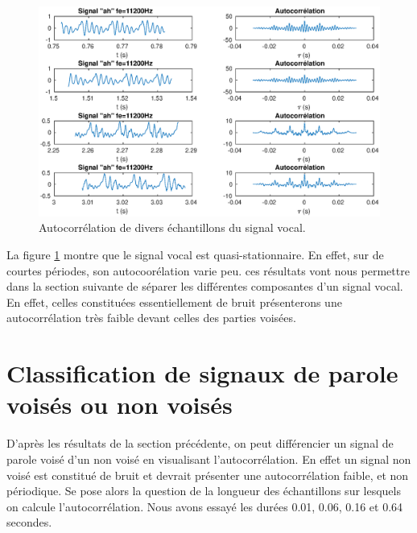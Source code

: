 \documentclass[french]{article}
\begin{document}
\begin{figure}[h!]
\centering
\includegraphics[width=\textwidth]{images/classificationAh.eps}
\caption{Autocorrélation de divers échantillons du signal vocal.}
\label{classifAh}
\end{figure}

La figure \ref{classifAh} montre que le signal vocal est quasi-stationnaire. En effet, sur de courtes périodes, son autocoorélation varie peu. ces résultats vont nous permettre dans la section suivante de séparer les différentes composantes d'un signal vocal. En effet, celles constituées essentiellement de bruit présenterons une autocorrélation très faible devant celles des parties voisées.

\FloatBarrier

\section{ Classification de signaux de parole voisés ou non voisés}

D'après les résultats de la section précédente, on peut différencier un signal de parole voisé d'un non voisé en visualisant l'autocorrélation. En effet un signal non voisé est constitué de bruit et devrait présenter une autocorrélation faible, et non périodique. Se pose alors la question de la longueur des échantillons sur lesquels on calcule l'autocorrélation. Nous avons essayé les durées 0.01, 0.06, 0.16 et 0.64 secondes.
\end{document}
